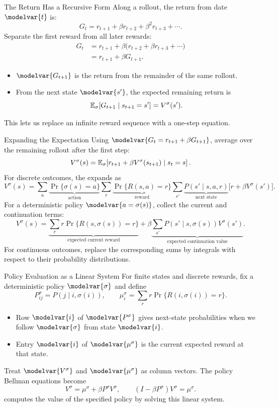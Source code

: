 \begin{frame}{The Return Has a Recursive Form}
Along a rollout, the return from date \(\modelvar{t}\) is:
\[G_t=r_{t+1}+\beta r_{t+2}+\beta^2r_{t+3}+\cdots.\]
Separate the first reward from all later rewards:
\begin{align*}
G_t&=r_{t+1}+\beta\big(r_{t+2}+\beta r_{t+3}+\cdots\big)\\
   &=r_{t+1}+\beta G_{t+1}.
\end{align*}
\begin{itemize}
\item \(\modelvar{G_{t+1}}\) is the return from the remainder of the same rollout.
\item From the next state \(\modelvar{s'}\), the expected remaining return is
\[\mathbb E_\sigma[G_{t+1}\mid s_{t+1}=s']=V^\sigma(s').\]
\end{itemize}
This lets us replace an infinite reward sequence with a one-step equation.
\end{frame}

\begin{frame}{Expanding the Expectation}
\small
Using \(\modelvar{G_t=r_{t+1}+\beta G_{t+1}}\), average over the remaining rollout after the first step:
\[V^\sigma(s)=\mathbb E_\sigma\!\left[r_{t+1}+\beta V^\sigma(s_{t+1})\mid s_t=s\right].\]
For discrete outcomes, the  expands as
\[V^\sigma(s)=
\sum_a\underbrace{\Pr\{\sigma(s)=a\}}_{\text{action}}
\sum_r\underbrace{\Pr\{R(s,a)=r\}}_{\text{reward}}
\sum_{s'}\underbrace{P(s'\mid s,a,r)}_{\text{next state}}
\bigl[r+\beta V^\sigma(s')\bigr].\]
For a deterministic policy \(\modelvar{a=\sigma(s)}\), collect the current and continuation terms:
\[V^\sigma(s)=
\underbrace{\sum_r r\Pr\{R(s,\sigma(s))=r\}}_{\text{expected current reward}}
+\beta\underbrace{\sum_{s'}P(s'\mid s,\sigma(s))V^\sigma(s')}_{\text{expected continuation value}}.\]
\footnotesize For continuous outcomes, replace the corresponding sums by integrals with respect to their probability distributions.
\end{frame}

\begin{frame}{Policy Evaluation as a Linear System}
For finite states and discrete rewards, fix a deterministic policy \(\modelvar{\sigma}\) and define
\[P^\sigma_{ij}=P(j\mid i,\sigma(i)),\qquad \mu^\sigma_i=\sum_r r\Pr\{R(i,\sigma(i))=r\}.\]
\begin{itemize}
\item Row \(\modelvar{i}\) of \(\modelvar{P^\sigma}\) gives next-state probabilities when we follow \(\modelvar{\sigma}\) from state \(\modelvar{i}\).
\item Entry \(\modelvar{i}\) of \(\modelvar{\mu^\sigma}\) is the current expected reward at that state.
\end{itemize}
Treat \(\modelvar{V^\sigma}\) and \(\modelvar{\mu^\sigma}\) as column vectors. The policy Bellman equations become
\[V^\sigma=\mu^\sigma+\beta P^\sigma V^\sigma,
\qquad (I-\beta P^\sigma)V^\sigma=\mu^\sigma.\]
 computes the value of the specified policy by solving this linear system.
\end{frame}

